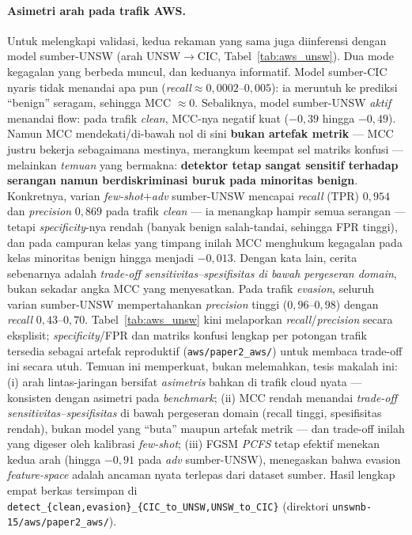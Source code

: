 \documentclass[11pt,a4paper]{article}
\begin{document}
\paragraph{Asimetri arah pada trafik AWS.} Untuk melengkapi validasi, kedua rekaman
yang sama juga diinferensi dengan model sumber-UNSW (arah UNSW$\rightarrow$CIC,
Tabel~\ref{tab:aws_unsw}). Dua mode kegagalan yang berbeda muncul, dan keduanya
informatif. Model sumber-CIC nyaris tidak menandai apa pun (\emph{recall}$\approx
0{,}0002$--$0{,}005$): ia meruntuh ke prediksi ``benign'' seragam, sehingga MCC
$\approx 0$. Sebaliknya, model sumber-UNSW \emph{aktif} menandai flow: pada trafik \emph{clean},
MCC-nya negatif kuat ($-0{,}39$ hingga $-0{,}49$). Namun MCC mendekati/di-bawah nol
di sini \textbf{bukan artefak metrik} --- MCC justru bekerja sebagaimana mestinya,
merangkum keempat sel matriks konfusi --- melainkan \emph{temuan} yang bermakna:
\textbf{detektor tetap sangat sensitif terhadap serangan namun berdiskriminasi buruk
pada minoritas benign}. Konkretnya, varian \emph{few-shot$+$adv} sumber-UNSW
mencapai \emph{recall} (TPR) $0{,}954$ dan \emph{precision} $0{,}869$ pada trafik
\emph{clean} --- ia menangkap hampir semua serangan --- tetapi \emph{specificity}-nya
rendah (banyak benign salah-tandai, sehingga FPR tinggi), dan pada campuran kelas
yang timpang inilah MCC menghukum kegagalan pada kelas minoritas benign hingga
menjadi $-0{,}013$. Dengan kata lain, cerita sebenarnya adalah \emph{trade-off
sensitivitas--spesifisitas di bawah pergeseran domain}, bukan sekadar angka MCC yang
menyesatkan. Pada trafik \emph{evasion}, seluruh varian sumber-UNSW mempertahankan
\emph{precision} tinggi ($0{,}96$--$0{,}98$) dengan \emph{recall} $0{,}43$--$0{,}70$.
Tabel~\ref{tab:aws_unsw} kini melaporkan \emph{recall}/\emph{precision} secara
eksplisit; \emph{specificity}/FPR dan matriks konfusi lengkap per potongan trafik
tersedia sebagai artefak reproduktif (\texttt{aws/paper2\_aws/}) untuk membaca
trade-off ini secara utuh. Temuan ini
memperkuat, bukan melemahkan, tesis makalah ini: (i) arah lintas-jaringan bersifat
\emph{asimetris} bahkan di trafik cloud nyata --- konsisten dengan asimetri pada
\emph{benchmark}; (ii) MCC rendah menandai \emph{trade-off
sensitivitas--spesifisitas} di bawah pergeseran domain (recall tinggi, spesifisitas
rendah), bukan model yang ``buta'' maupun artefak metrik --- dan trade-off inilah
yang digeser oleh kalibrasi \emph{few-shot};
(iii) FGSM \emph{PCFS} tetap efektif menekan kedua arah (hingga
$-0{,}91$ pada \emph{adv} sumber-UNSW), menegaskan bahwa evasion \emph{feature-space}
adalah ancaman nyata terlepas dari dataset sumber. Hasil lengkap empat berkas
tersimpan di \texttt{detect\_\{clean,evasion\}\_\{CIC\_to\_UNSW,UNSW\_to\_CIC\}}
(direktori \texttt{unswnb-15/aws/paper2\_aws/}).
\end{document}
